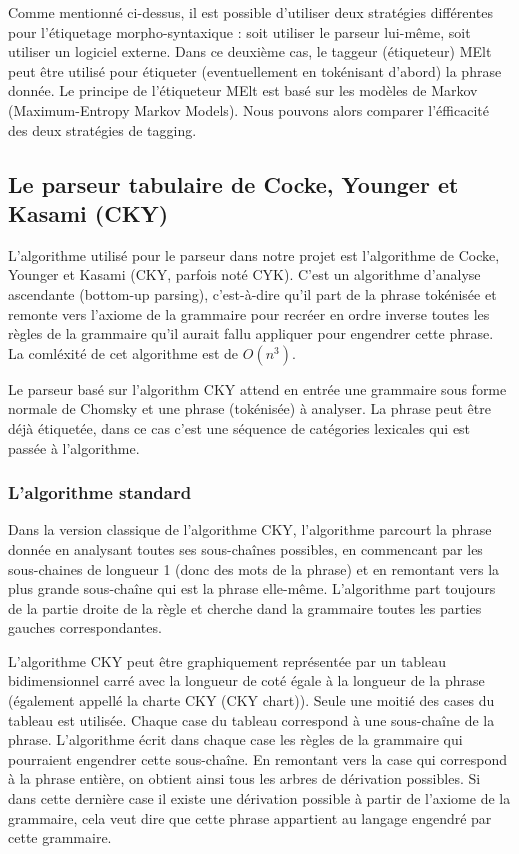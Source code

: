 \documentclass[12pt]{article}
\begin{document}
Comme mentionn\'e ci-dessus, il est possible d'utiliser deux strat\'egies
diff\'erentes pour l'\'etiquetage morpho-syntaxique : soit utiliser le parseur
lui-m\^eme, soit utiliser un logiciel externe. Dans ce deuxi\`eme cas, le taggeur
(\'etiqueteur) MElt \cite{MElt} peut \^etre utilis\'e pour \'etiqueter (eventuellement
en tok\'enisant d'abord) la phrase donn\'ee. Le principe de l'\'etiqueteur MElt est
bas\'e sur les mod\`eles de Markov (Maximum-Entropy Markov Models).
Nous pouvons alors comparer l'\'efficacit\'e des deux strat\'egies de tagging.

\subsection{Le parseur tabulaire de Cocke, Younger et Kasami (CKY)}

L'algorithme utilis\'e pour le parseur dans notre projet est l'algorithme de
Cocke, Younger et Kasami (CKY, parfois not\'e CYK). C'est un algorithme d'analyse
ascendante (bottom-up parsing), c'est-\`a-dire qu'il part de la phrase tok\'enis\'ee
et remonte vers l'axiome de la grammaire pour recr\'eer en ordre inverse toutes les r\`egles de la grammaire qu'il
aurait fallu appliquer pour engendrer cette phrase. La coml\'exit\'e de cet
algorithme est de $O(n^3)$. \par

Le parseur bas\'e sur l'algorithm CKY attend en entr\'ee une grammaire sous forme
normale de Chomsky et une phrase (tok\'enis\'ee) \`a analyser. La phrase peut \^etre
d\'ej\`a \'etiquet\'ee, dans ce cas c'est une s\'equence de cat\'egories lexicales qui est
pass\'ee \`a l'algorithme.

\subsubsection{L'algorithme standard}
Dans la version classique de l'algorithme CKY, l'algorithme parcourt la phrase
donn\'ee en analysant toutes ses sous-cha\^ines possibles, en commencant par les
sous-chaines de longueur 1 (donc des mots de la phrase) et en remontant vers la
plus grande sous-cha\^ine qui est la phrase elle-m\^eme. L'algorithme
part toujours de la partie droite de la r\`egle et cherche dand la
grammaire toutes les parties gauches correspondantes. \par

L'algorithme CKY peut
\^etre graphiquement repr\'esent\'ee par un tableau bidimensionnel carr\'e avec la longueur de cot\'e \'egale \`a la longueur de la phrase (\'egalement appell\'e la charte CKY (CKY chart)).
Seule une moiti\'e des cases du tableau est utilis\'ee. Chaque case du tableau correspond \`a une sous-cha\^ine de la phrase.
L'algorithme \'ecrit dans chaque case les r\`egles de la grammaire qui pourraient
engendrer cette sous-cha\^ine. En remontant vers la case qui correspond \`a la
phrase enti\`ere, on obtient ainsi tous les arbres de d\'erivation possibles. Si
dans cette derni\`ere case il existe une d\'erivation possible \`a partir de l'axiome
de la grammaire, cela veut dire que cette phrase appartient au langage engendr\'e
par cette grammaire.\par
\end{document}
